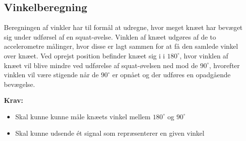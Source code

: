 \subsection{Vinkelberegning}
Beregningen af vinkler har til formål at udregne, hvor meget knæet har bevæget sig under udførsel af en squat-øvelse. Vinklen af knæet udgøres af de to accelerometre målinger, hvor disse er lagt sammen for at få den samlede vinkel over knæet.
Ved oprejst position befinder knæet sig i i $180^{\circ}$, hvor vinklen af knæet vil blive mindre ved udførelse af squat-øvelsen ned mod de $90^{\circ}$, hvorefter vinklen vil være stigende når de $90^{\circ}$ er opnået og der udføres en opadgående bevægelse. 

\textbf{Krav:}
\begin{itemize}
\item Skal kunne kunne måle knæets vinkel mellem $180^{\circ}$ og $90^{\circ}$
\item Skal kunne udsende ét signal som repræsenterer en given vinkel
\end{itemize}